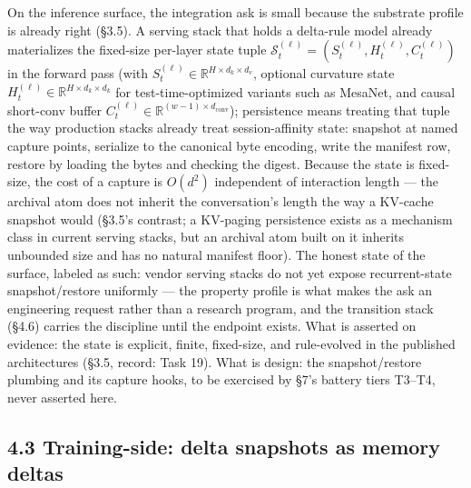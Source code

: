 \documentclass[11pt]{article}
\begin{document}
On the inference surface, the integration ask is small because the substrate profile is already right (\S{}3.5). A serving stack that holds a delta-rule model already materializes the fixed-size per-layer state tuple \(\mathcal{S}_t^{(\ell)} = (S_t^{(\ell)}, H_t^{(\ell)}, C_t^{(\ell)})\) in the forward pass (with \(S_t^{(\ell)} \in \mathbb{R}^{H\times d_k\times d_v}\), optional curvature state \(H_t^{(\ell)} \in \mathbb{R}^{H\times d_k\times d_k}\) for test-time-optimized variants such as MesaNet, and causal short-conv buffer \(C_t^{(\ell)} \in \mathbb{R}^{(w-1)\times d_{\text{conv}}}\)); persistence means treating that tuple the way production stacks already treat session-affinity state: snapshot at named capture points, serialize to the canonical byte encoding, write the manifest row, restore by loading the bytes and checking the digest. Because the state is fixed-size, the cost of a capture is \(O(d^{2})\) independent of interaction length --- the archival atom does not inherit the conversation's length the way a KV-cache snapshot would (\S{}3.5's contrast; a KV-paging persistence exists as a mechanism class in current serving stacks, but an archival atom built on it inherits unbounded size and has no natural manifest floor). The honest state of the surface, labeled as such: vendor serving stacks do not yet expose recurrent-state snapshot/restore uniformly --- the property profile is what makes the ask an engineering request rather than a research program, and the transition stack (\S{}4.6) carries the discipline until the endpoint exists. What is asserted on evidence: the state is explicit, finite, fixed-size, and rule-evolved in the published architectures (\S{}3.5, record: Task 19). What is design: the snapshot/restore plumbing and its capture hooks, to be exercised by \S{}7's battery tiers T3--T4, never asserted here.

\subsection{4.3 Training-side: delta snapshots as memory deltas}\label{training-side-delta-snapshots-as-memory-deltas}
\end{document}
